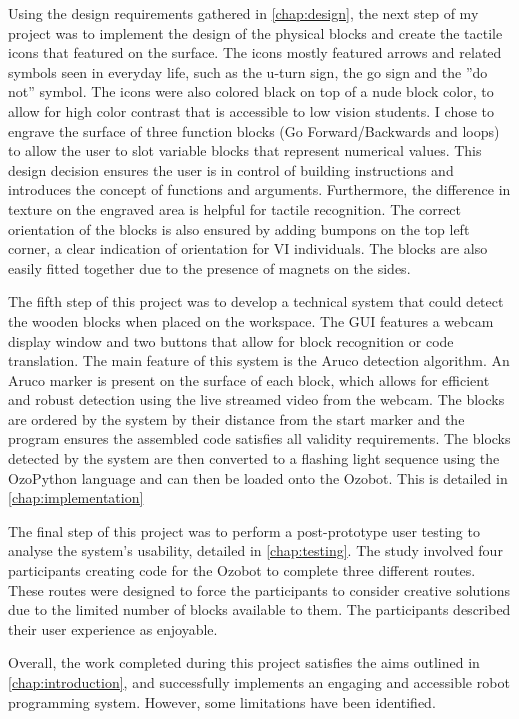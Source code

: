 \documentclass[oneside,%
                    author={Malak Hajji},
                    degree={BSc},
                    title={Designing An Accessible Ozobot Programming Platform for Students},
                  subtitle={With Mixed Visual Abilities}]{dissertation}
\begin{document}
Using the design requirements gathered in \ref{chap:design}, the next step of my project was to implement the design of the physical blocks and create the tactile icons that featured on the surface. The icons mostly featured arrows and related symbols seen in everyday life, such as the u-turn sign, the go sign and the ”do not” symbol. The icons were also colored black on top of a nude block color, to allow for high color contrast that is accessible to low vision students. I chose to engrave the surface of three function blocks (Go Forward/Backwards and loops) to allow the user to slot variable blocks that represent numerical values. This design decision ensures the user is in control of building instructions and introduces the concept of functions and arguments. Furthermore, the difference in texture on the engraved area is helpful for tactile recognition. The correct orientation of the blocks is also ensured by adding bumpons on the top left corner, a clear indication of orientation for VI individuals. The blocks are also easily fitted together due to the presence of magnets on the sides.

The fifth step of this project was to develop a technical system that could detect the wooden blocks when placed on the workspace. The GUI features a webcam display window and two buttons that allow for block recognition or code translation. The main feature of this system is the Aruco detection algorithm. An Aruco marker is present on the surface of each block, which allows for efficient and robust detection using the live streamed video from the webcam. The blocks are ordered by the system by their distance from the start marker and the program ensures the assembled code satisfies all validity requirements. The blocks detected by the system are then converted to a flashing light sequence using the OzoPython language and can then be loaded onto the Ozobot. This is detailed in \ref{chap:implementation}

The final step of this project was to perform a post-prototype user testing to analyse the system’s usability, detailed in \ref{chap:testing}. The study involved four participants creating code for the Ozobot to complete three different routes. These routes were designed to force the participants to consider creative solutions due to the limited number of blocks available to them. The participants described their user experience as enjoyable.

Overall, the work completed during this project satisfies the aims outlined in \ref{chap:introduction}, and successfully implements an engaging and accessible robot programming system. However, some limitations have been identified.
\end{document}
